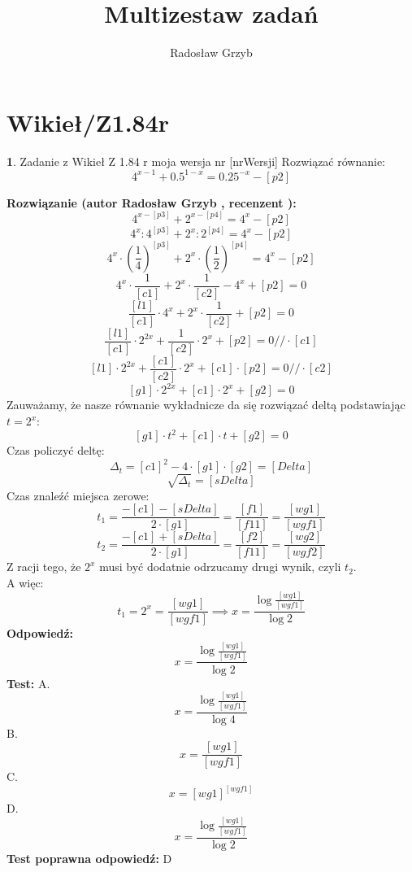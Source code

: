 \documentclass[12pt, a4paper]{article}
\title{Multizestaw zadań}
\author{Radosław Grzyb}
\date{}
\theoremstyle{definition} %
\newtheorem{zad}{}
\newcommand{\kategoria}[1]{\section{#1}} %
\newcommand{\zadStart}[1]{\begin{zad}#1\newline} %
\newcommand{\zadStop}{\end{zad}}   %
\newcommand{\rozwStart}[2]{\noindent \textbf{Rozwiązanie (autor #1 , recenzent #2): }\newline} %
\newcommand{\rozwStop}{\newline}                                            %
\newcommand{\odpStart}{\noindent \textbf{Odpowiedź:}\newline}    %
\newcommand{\odpStop}{\newline}                                             %
\newcommand{\testStart}{\noindent \textbf{Test:}\newline} %
\newcommand{\testStop}{\newline} %
\newcommand{\kluczStart}{\noindent \textbf{Test poprawna odpowiedź:}\newline} %
\newcommand{\kluczStop}{\newline} %
\begin{document}
\maketitle
\kategoria{Wikieł/Z1.84r}
\zadStart{Zadanie z Wikieł Z 1.84 r moja wersja nr [nrWersji]}
Rozwiązać równanie:
$$4^{x-1}+0.5^{1-x}=0.25^{-x}-[p2]$$
\zadStop
\rozwStart{Radosław Grzyb}{}
$$4^{x-[p3]}+2^{x-[p4]}=4^{x}-[p2]$$
$$4^{x}:4^{[p3]}+2^{x}:2^{[p4]}=4^{x}-[p2]$$
$$4^{x}\cdot(\frac{1}{4})^{[p3]}+2^{x}\cdot(\frac{1}{2})^{[p4]}=4^{x}-[p2]$$
$$4^{x}\cdot\frac{1}{[c1]}+2^{x}\cdot\frac{1}{[c2]}-4^{x}+[p2]=0$$
$$\frac{[l1]}{[c1]}\cdot4^{x}+2^{x}\cdot\frac{1}{[c2]}+[p2]=0$$
$$\frac{[l1]}{[c1]}\cdot2^{2x}+\frac{1}{[c2]}\cdot2^{x}+[p2]=0 //\cdot[c1]$$
$$[l1]\cdot2^{2x}+\frac{[c1]}{[c2]}\cdot2^{x}+[c1]\cdot[p2]=0 //\cdot[c2]$$
$$[g1]\cdot2^{2x}+[c1]\cdot2^{x}+[g2]=0$$
Zauważamy, że nasze równanie wykładnicze da się rozwiązać deltą podstawiając $t=2^{x}$:
$$[g1]\cdot t^{2}+[c1]\cdot t+[g2]=0$$
Czas policzyć deltę:
$$\Delta_{t}=[c1]^{2}-4\cdot[g1]\cdot[g2]=[Delta]$$
$$\sqrt{\Delta_{t}}=[sDelta]$$
Czas znaleźć miejsca zerowe:
$$t_{1}=\frac{-[c1]-[sDelta]}{2\cdot[g1]}=\frac{[f1]}{[f11]}=\frac{[wg1]}{[wgf1]}$$
$$t_{2}=\frac{-[c1]+[sDelta]}{2\cdot[g1]}=\frac{[f2]}{[f11]}=\frac{[wg2]}{[wgf2]}$$
Z racji tego, że $2^{x}$ musi być dodatnie odrzucamy drugi wynik, czyli $t_{2}$.\\
A więc:
$$t_{1}=2^{x}=\frac{[wg1]}{[wgf1]}\implies x=\frac{\log\frac{[wg1]}{[wgf1]}}{\log2}$$
\rozwStop
\odpStart
$$x=\frac{\log\frac{[wg1]}{[wgf1]}}{\log2}$$
\odpStop
\testStart
A. $$x=\frac{\log\frac{[wg1]}{[wgf1]}}{\log4}$$
B. $$x=\frac{[wg1]}{[wgf1]}$$
C. $$x=[wg1]^{[wgf1]}$$
D. $$x=\frac{\log\frac{[wg1]}{[wgf1]}}{\log2}$$
\testStop
\kluczStart
D
\kluczStop
\end{document}
